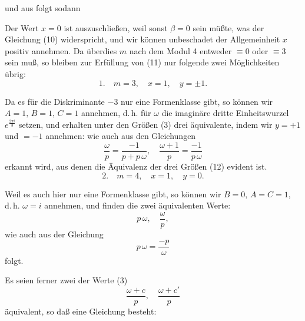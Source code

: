 und aus
folgt sodann

Der Wert $x=0$ ist auszuschließen, weil sonst $\beta=0$ sein müßte, was der Gleichung (10) widerspricht, und wir können unbeschadet der Allgemeinheit $x$ positiv annehmen. Da überdies $m$ nach dem Modul 4 entweder $\equiv 0$ oder $\equiv 3$ sein muß, so bleiben zur Erfüllung von (11) nur folgende zwei Möglichkeiten übrig:
\[
1.\quad m=3,\quad x=1,\quad y=\pm 1.
\]

Da es für die Diskriminante $-3$ nur eine Formenklasse gibt, so können wir $A=1,\,B=1,\,C=1$ annehmen, d.\,h. für $\omega$ die imaginäre dritte Einheitswurzel $e^{\frac{2\pi i}{3}}$ setzen, und erhalten unter den Größen (3) drei äquivalente, indem wir $y=+1$ und $=-1$ annehmen: %
wie auch aus den Gleichungen
\[
\frac{\omega}{p} = \frac{-1}{p+p\,\omega}, \quad \frac{\omega+1}{p} = \frac{-1}{p\,\omega}
\]
erkannt wird, aus denen die Äquivalenz der drei Größen (12) evident ist.
\[
2.\quad m=4,\quad x=1,\quad y=0.
\]

Weil es auch hier nur eine Formenklasse gibt, so können wir $B=0,\,A=C=1$, d.\,h. $\omega=i$ annehmen, und finden die zwei äquivalenten Werte:
\[
p\,\omega,\quad \frac{\omega}{p},
\]
wie auch aus der Gleichung
\[
p\,\omega = \frac{-p}{\omega}
\]
folgt.

Es seien ferner zwei der Werte (3)
\[
\frac{\omega+c}{p}, \quad \frac{\omega+c'}{p}
\]
äquivalent, so daß eine Gleichung besteht:
